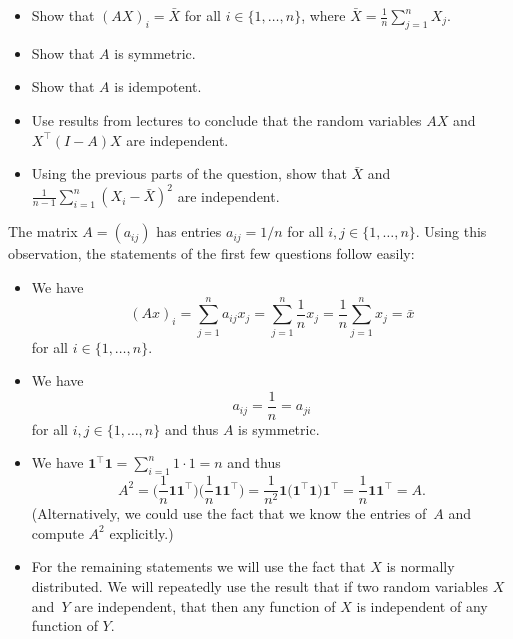 \documentclass[
  a4paper,
]{article}
\theoremstyle{definition}
\theoremstyle{definition}
\theoremstyle{definition}
\theoremstyle{definition}
\theoremstyle{remark}
\begin{document}
\begin{itemize}
\item
  Show that \((AX)_i = \bar X\) for all \(i \in \{1, \ldots, n\}\),
  where \(\bar X = \frac1n \sum_{j=1}^n X_j\).
\item
  Show that \(A\) is symmetric.
\item
  Show that \(A\) is idempotent.
\item
  Use results from lectures to conclude that the random
  variables \(AX\) and \(X^\top (I-A)X\) are independent.
\item
  Using the previous parts of the question, show that \(\bar X\)
  and \(\frac{1}{n-1} \sum_{i=1}^n (X_i - \bar X)^2\) are independent.
\end{itemize}

\begin{myanswers}

The matrix \(A = (a_{ij})\) has entries \(a_{ij} = 1/n\) for all
\(i, j \in \{1, \ldots, n\}\). Using this observation, the statements
of the first few questions follow easily:

\begin{itemize}
\item
  We have
  \begin{equation*}
    (Ax)_i
    = \sum_{j=1}^n a_{ij} x_j
    = \sum_{j=1}^n \frac1n x_j
    = \frac1n \sum_{j=1}^n x_j
    = \bar x
  \end{equation*}
  for all \(i \in \{1, \ldots, n\}\).
\item
  We have
  \begin{equation*}
    a_{ij}
    = \frac1n
    = a_{ji}
  \end{equation*}
  for all \(i, j \in \{1, \ldots, n\}\) and thus \(A\) is symmetric.
\item
  We have
  \(\mathbf{1}^\top \mathbf{1} = \sum_{i=1}^n 1 \cdot 1 = n\) and
  thus
  \begin{equation*}
    A^2
    = \bigl( \frac1n \mathbf{1} \mathbf{1}^\top \bigr)
        \bigl( \frac1n \mathbf{1} \mathbf{1}^\top \bigr)
    = \frac{1}{n^2} \mathbf{1}
        \bigl(\mathbf{1}^\top\mathbf{1}\bigr) \mathbf{1}^\top
    = \frac1n \mathbf{1} \mathbf{1}^\top
    = A.
  \end{equation*}
  (Alternatively, we could use the fact that we know the entries
  of~\(A\) and compute \(A^2\) explicitly.)
\item
  For the remaining statements we will use the fact that \(X\) is
  normally distributed. We will repeatedly use the
  result that if two random variables \(X\) and~\(Y\) are independent,
  that then any function of \(X\) is independent of any function of
  \(Y\).


\end{itemize}
\end{myanswers}
\end{document}
